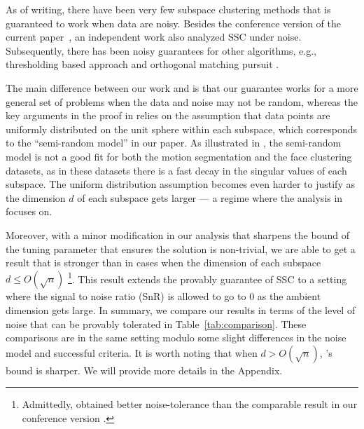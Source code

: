 \documentclass{ctexart}
\begin{document}
As of writing, there have been very few subspace clustering methods that is guaranteed to work when data are noisy.  Besides the conference version of the current paper~\cite{wang2013noisy}, an independent work \cite{soltanolkotabi2013robust} also analyzed SSC under noise. Subsequently, there has been noisy guarantees for other algorithms, e.g., thresholding based approach \cite{heckel2013noisy} and
orthogonal matching pursuit \cite{dyer2013greedy}.

The main difference between our work and \cite{soltanolkotabi2013robust} is that our guarantee works for a more general set of problems when the data and noise may not be random, whereas the key arguments in the proof in \cite{soltanolkotabi2013robust} relies on the assumption that data points are uniformly distributed on the unit sphere within each subspace, which corresponds to the ``semi-random model'' in our paper.
As illustrated in \cite[Figure~9~and~10]{elhamifar2012ssc_journal}, the semi-random model is not a good fit for both the motion segmentation and the face clustering datasets, as in these datasets there is a fast decay in the singular values of each subspace.  The uniform distribution assumption becomes even harder to justify as the dimension $d$ of each subspace gets larger --- a regime where the analysis in \cite{soltanolkotabi2013robust} focuses on.

Moreover, with a minor modification in our analysis that sharpens the bound of the tuning parameter that ensures the solution is non-trivial, we are able to get a result that is stronger than \cite{soltanolkotabi2013robust} in cases when the dimension of each subspace $d\leq O(\sqrt{n})$ \footnote{Admittedly, \cite{soltanolkotabi2013robust} obtained better noise-tolerance than the comparable result in our conference version \cite{wang2013noisy}. }. This result extends the provably guarantee of SSC to a setting where the signal to noise ratio (SnR) is allowed to go to $0$ as the ambient dimension gets large. In summary, we compare our results in terms of the level of noise that can be provably tolerated in Table~\ref{tab:comparison}. These comparisons are in the same setting modulo some slight differences in the noise model and successful criteria. It is worth noting that when $d>O(\sqrt{n})$, \cite{soltanolkotabi2013robust}'s bound is sharper. We will provide more details in the Appendix.


\end{document}
